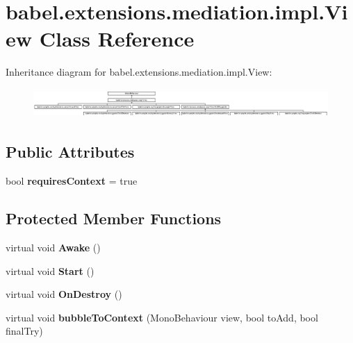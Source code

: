 \hypertarget{classbabel_1_1extensions_1_1mediation_1_1impl_1_1_view}{\section{babel.\-extensions.\-mediation.\-impl.\-View Class Reference}
\label{classbabel_1_1extensions_1_1mediation_1_1impl_1_1_view}
}
Inheritance diagram for babel.\-extensions.\-mediation.\-impl.\-View\-:\begin{figure}[H]
\begin{center}
\leavevmode
\includegraphics[height=1.124498cm]{classbabel_1_1extensions_1_1mediation_1_1impl_1_1_view}
\end{center}
\end{figure}
\subsection*{Public Attributes}
\begin{DoxyCompactItemize}
\item 
\hypertarget{classbabel_1_1extensions_1_1mediation_1_1impl_1_1_view_a2dd67900535e5c4671b154f6f2b95fcc}{bool {\bfseries requires\-Context} = true}\label{classbabel_1_1extensions_1_1mediation_1_1impl_1_1_view_a2dd67900535e5c4671b154f6f2b95fcc}

\end{DoxyCompactItemize}
\subsection*{Protected Member Functions}
\begin{DoxyCompactItemize}
\item 
\hypertarget{classbabel_1_1extensions_1_1mediation_1_1impl_1_1_view_ae29c37a82137d9a28621c10ddd9a24bd}{virtual void {\bfseries Awake} ()}\label{classbabel_1_1extensions_1_1mediation_1_1impl_1_1_view_ae29c37a82137d9a28621c10ddd9a24bd}

\item 
\hypertarget{classbabel_1_1extensions_1_1mediation_1_1impl_1_1_view_aa43ebccb4711105cc9fff260fb7d70e8}{virtual void {\bfseries Start} ()}\label{classbabel_1_1extensions_1_1mediation_1_1impl_1_1_view_aa43ebccb4711105cc9fff260fb7d70e8}

\item 
\hypertarget{classbabel_1_1extensions_1_1mediation_1_1impl_1_1_view_a27f1082e7fc86fff059e56236590b89a}{virtual void {\bfseries On\-Destroy} ()}\label{classbabel_1_1extensions_1_1mediation_1_1impl_1_1_view_a27f1082e7fc86fff059e56236590b89a}

\item 
\hypertarget{classbabel_1_1extensions_1_1mediation_1_1impl_1_1_view_a785770774981d0b6e33aaad0ea018ea6}{virtual void {\bfseries bubble\-To\-Context} (Mono\-Behaviour view, bool to\-Add, bool final\-Try)}\label{classbabel_1_1extensions_1_1mediation_1_1impl_1_1_view_a785770774981d0b6e33aaad0ea018ea6}

\end{DoxyCompactItemize}
